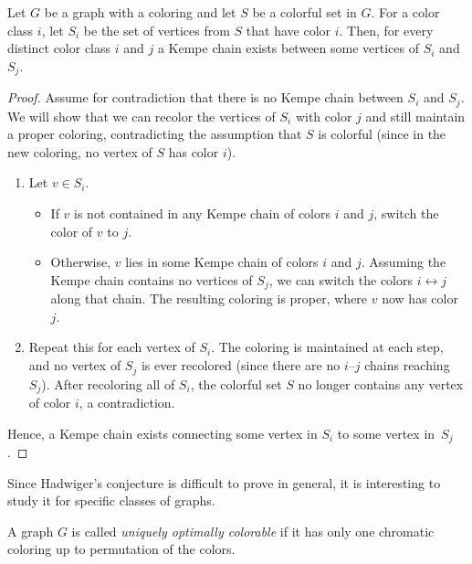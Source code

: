 \begin{lemma}
    \label{colorful_kempe}
 Let $G$ be a graph with a coloring and let $S$ be a colorful set in $G$. For a color class $i$, let 
    $S_i$ be the set of vertices from $S$ that have color $i$. Then, for every distinct color class $i$ and $j$
 a Kempe chain exists between some vertices of $S_i$ and $S_j$.
\end{lemma}
\begin{proof}
 Assume for contradiction that there is no Kempe chain between $S_i$ and $S_j$. We will show that we can recolor the vertices of $S_i$ with color $j$ and still maintain a proper coloring, contradicting the assumption that $S$ is colorful (since in the new coloring, no vertex of $S$ has color $i$).
    
    \begin{enumerate}
      \item Let $v\in S_i$.
        \begin{itemize}
          \item If $v$ is not contained in any Kempe chain of colors $i$ and $j$, switch the color of $v$ to $j$.
          \item Otherwise, $v$ lies in some Kempe chain of colors $i$ and $j$.  Assuming the Kempe chain contains no vertices of $S_j$, we can switch the colors $i\leftrightarrow j$ along that chain. The resulting coloring is proper, where $v$ now has color $j$.
        \end{itemize}
      \item Repeat this for each vertex of $S_i$. The coloring is maintained at each step, and no vertex of $S_j$ is ever recolored (since there are no $i$–$j$ chains reaching~$S_j$). After recoloring all of $S_i$, the colorful set $S$ no longer contains any vertex of color $i$, a contradiction.
    \end{enumerate}
    
 Hence, a Kempe chain exists connecting some vertex in $S_i$ to some vertex in~$S_j$.
    \end{proof}

    Since Hadwiger's conjecture is difficult to prove in general, it is interesting to study it for specific classes of graphs.

    \begin{defn}
    \label{def:uniquely_colorable}
    A graph $G$ is called \emph{uniquely optimally colorable} if it has only one chromatic coloring up to permutation of the colors.
    \end{defn}
    
